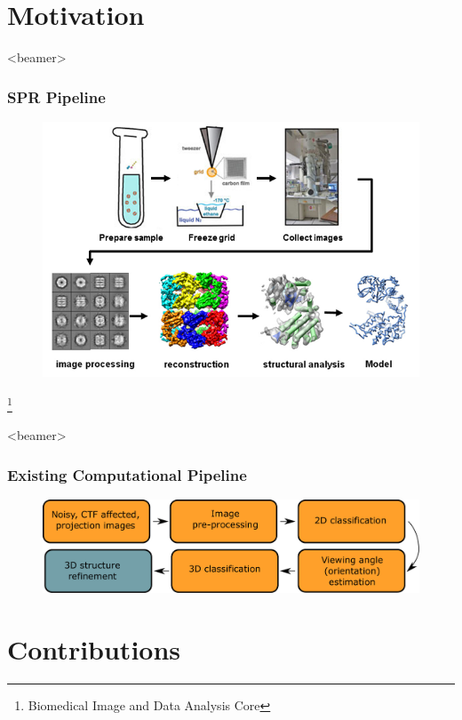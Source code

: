 \documentclass{beamer}
\newcommand\blfootnote[1]{%
  \begingroup
  \renewcommand\thefootnote{}\footnote{#1}%
  \addtocounter{footnote}{-1}%
  \endgroup
}
\begin{document}
\section{Motivation}

\begin{frame}<beamer>
\frametitle{SPR Pipeline}
\begin{figure}[h]
\centering
{\includegraphics[scale=0.55]{figures/pipeline_pics.png}}
\label{fig:rawims}
\end{figure}
\blfootnote{Biomedical Image and Data Analysis Core}
\end{frame}

\begin{frame}<beamer>
\frametitle{Existing Computational Pipeline}
\begin{figure}[h]
\centering
{\includegraphics[scale=0.4]{figures/cryoem_pipeline.pdf}}\\
\label{fig:rawims}
\end{figure}
\end{frame}

\section{Contributions}
\end{document}
